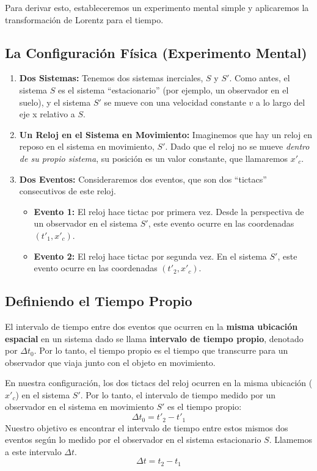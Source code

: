 \documentclass[11pt,a4paper]{book}
\begin{document}
Para derivar esto, estableceremos un experimento mental simple y aplicaremos la transformación de Lorentz para el tiempo.

\subsection{La Configuración Física (Experimento Mental)}

\begin{enumerate}
    \item \textbf{Dos Sistemas:} Tenemos dos sistemas inerciales, $S$ y $S'$. Como antes, el sistema $S$ es el sistema ``estacionario'' (por ejemplo, un observador en el suelo), y el sistema $S'$ se mueve con una velocidad constante $v$ a lo largo del eje x relativo a $S$.

    \item \textbf{Un Reloj en el Sistema en Movimiento:} Imaginemos que hay un reloj en reposo en el sistema en movimiento, $S'$. Dado que el reloj no se mueve \textit{dentro de su propio sistema}, su posición es un valor constante, que llamaremos $x'_c$.

    \item \textbf{Dos Eventos:} Consideraremos dos eventos, que son dos ``tictacs'' consecutivos de este reloj.
    \begin{itemize}
        \item \textbf{Evento 1:} El reloj hace tictac por primera vez. Desde la perspectiva de un observador en el sistema $S'$, este evento ocurre en las coordenadas $(t'_1, x'_c)$.
        \item \textbf{Evento 2:} El reloj hace tictac por segunda vez. En el sistema $S'$, este evento ocurre en las coordenadas $(t'_2, x'_c)$.
    \end{itemize}
\end{enumerate}

\subsection{Definiendo el Tiempo Propio}

El intervalo de tiempo entre dos eventos que ocurren en la \textbf{misma ubicación espacial} en un sistema dado se llama \textbf{intervalo de tiempo propio}, denotado por $\Delta t_0$. Por lo tanto, el tiempo propio es el tiempo que transcurre para un observador que viaja junto con el objeto en movimiento.

En nuestra configuración, los dos tictacs del reloj ocurren en la misma ubicación ($x'_c$) en el sistema $S'$. Por lo tanto, el intervalo de tiempo medido por un observador en el sistema en movimiento $S'$ es el tiempo propio:
\[ \Delta t_0 = t'_2 - t'_1 \]
Nuestro objetivo es encontrar el intervalo de tiempo entre estos mismos dos eventos según lo medido por el observador en el sistema estacionario $S$. Llamemos a este intervalo $\Delta t$.
\[ \Delta t = t_2 - t_1 \]
\end{document}
